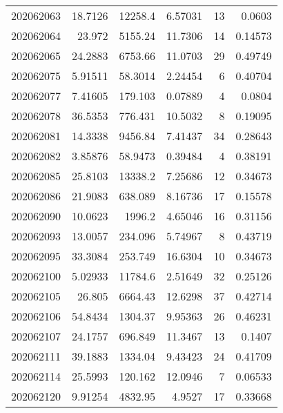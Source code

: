 \begin{tabular}{rrrrrr}
 202062063 &         18.7126  &    12258.4    &            6.57031 &          13 & 0.0603  \\
 202062064 &         23.972   &     5155.24   &           11.7306  &          14 & 0.14573 \\
 202062065 &         24.2883  &     6753.66   &           11.0703  &          29 & 0.49749 \\
 202062075 &          5.91511 &       58.3014 &            2.24454 &           6 & 0.40704 \\
 202062077 &          7.41605 &      179.103  &            0.07889 &           4 & 0.0804  \\
 202062078 &         36.5353  &      776.431  &           10.5032  &           8 & 0.19095 \\
 202062081 &         14.3338  &     9456.84   &            7.41437 &          34 & 0.28643 \\
 202062082 &          3.85876 &       58.9473 &            0.39484 &           4 & 0.38191 \\
 202062085 &         25.8103  &    13338.2    &            7.25686 &          12 & 0.34673 \\
 202062086 &         21.9083  &      638.089  &            8.16736 &          17 & 0.15578 \\
 202062090 &         10.0623  &     1996.2    &            4.65046 &          16 & 0.31156 \\
 202062093 &         13.0057  &      234.096  &            5.74967 &           8 & 0.43719 \\
 202062095 &         33.3084  &      253.749  &           16.6304  &          10 & 0.34673 \\
 202062100 &          5.02933 &    11784.6    &            2.51649 &          32 & 0.25126 \\
 202062105 &         26.805   &     6664.43   &           12.6298  &          37 & 0.42714 \\
 202062106 &         54.8434  &     1304.37   &            9.95363 &          26 & 0.46231 \\
 202062107 &         24.1757  &      696.849  &           11.3467  &          13 & 0.1407  \\
 202062111 &         39.1883  &     1334.04   &            9.43423 &          24 & 0.41709 \\
 202062114 &         25.5993  &      120.162  &           12.0946  &           7 & 0.06533 \\
 202062120 &          9.91254 &     4832.95   &            4.9527  &          17 & 0.33668 \\

\end{tabular}

